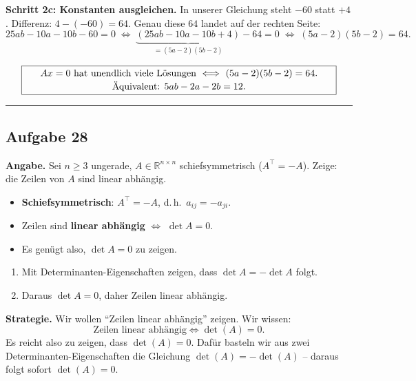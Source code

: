 \documentclass[a4paper,12pt]{article}
\begin{document}
\textbf{Schritt 2c: Konstanten ausgleichen.} In unserer Gleichung steht $-60$ statt $+4$. Differenz: $4 - (-60) = 64$. Genau diese $64$ landet auf der rechten Seite:
\[
25ab - 10a - 10b - 60 = 0
\;\Longleftrightarrow\; \underbrace{(25ab - 10a - 10b + 4)}_{= (5a-2)(5b-2)} - 64 = 0
\;\Longleftrightarrow\; (5a-2)(5b-2) = 64.
\]

\[
\fbox{\parbox{0.93\textwidth}{\centering
$Ax = 0$ hat unendlich viele L\"osungen $\iff$ $(5a-2)(5b-2) = 64$.\\[2pt]
\"Aquivalent: $5ab - 2a - 2b = 12$.
}}
\]

\bigskip
\hrule
\bigskip

\subsection*{Aufgabe 28}

\textbf{Angabe.} Sei $n \geq 3$ ungerade, $A \in \mathbb{R}^{n \times n}$ schiefsymmetrisch ($A^\top = -A$). Zeige: die Zeilen von $A$ sind linear abh\"angig.

\begin{begriffe}
\begin{itemize}[leftmargin=*, nosep]
    \item \textbf{Schiefsymmetrisch}: $A^\top = -A$, d.\,h.\ $a_{ij} = -a_{ji}$.
    \item Zeilen sind \textbf{linear abh\"angig} $\iff$ $\det A = 0$.
    \item Es gen\"ugt also, $\det A = 0$ zu zeigen.
\end{itemize}
\end{begriffe}

\begin{wastun}
\begin{enumerate}[leftmargin=*, nosep]
    \item Mit Determinanten-Eigenschaften zeigen, dass $\det A = -\det A$ folgt.
    \item Daraus $\det A = 0$, daher Zeilen linear abh\"angig.
\end{enumerate}
\end{wastun}

\textbf{Strategie.} Wir wollen ``Zeilen linear abh\"angig'' zeigen. Wir wissen:
$$\text{Zeilen linear abh\"angig} \iff \det(A) = 0.$$
Es reicht also zu zeigen, dass $\det(A) = 0$. Daf\"ur basteln wir aus zwei Determinanten-Eigenschaften die Gleichung $\det(A) = -\det(A)$ -- daraus folgt sofort $\det(A) = 0$.
\end{document}
